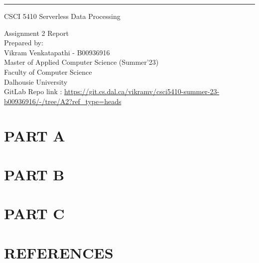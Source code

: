 \documentclass{scrreprt}
\date{\today}
\begin{document}
\begin{center}
  \rule{17cm}{5pt}\vskip1cm
  \begin{bfseries}
    \Large{CSCI 5410 Serverless Data Processing}\\
    \vspace{1.5cm}

    \vspace{1.5cm}

    \vspace{1.5cm}
    \Huge{Assignment 2 Report}\\
    \vspace{1.5cm}
    \LARGE{Prepared by: \\Vikram Venkatapathi - B00936916\\}
    \vspace{1.5cm}
    \vspace{1.5cm}
    \Large{Master of Applied Computer Science (Summer'23)\\
      Faculty of Computer Science\\
      Dalhousie University\\
      \vspace{3cm}
      GitLab Repo link : \url{https://git.cs.dal.ca/vikramv/csci5410-summer-23-b00936916/-/tree/A2?ref_type=heads}
    }
  \end{bfseries}
\end{center}



\newpage
{}

\newpage
{}
{}
\tableofcontents
\newpage
{}



\newpage
{}
\part{PART A}

\part{PART B}

\part{PART C}

\appendix
\newpage
\part{REFERENCES}

% 
% 
\end{document}
